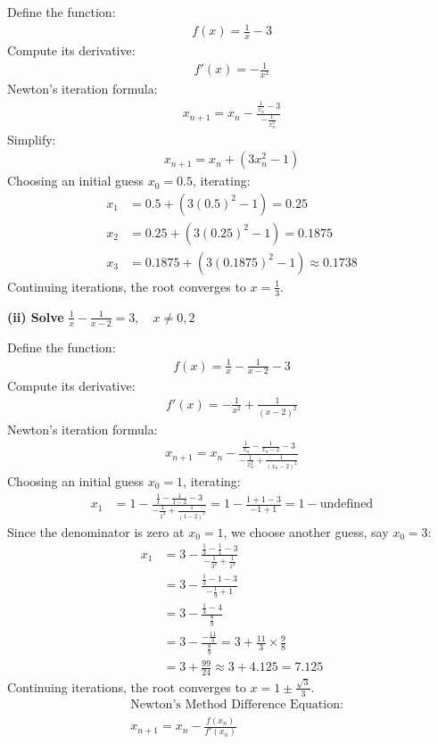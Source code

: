 \documentclass[journal]{IEEEtran}
\begin{document}
Define the function:
\begin{align}
    f(x) = \frac{1}{x} - 3
\end{align}
Compute its derivative:
\begin{align}
    f'(x) = -\frac{1}{x^2}
\end{align}
Newton's iteration formula:
\begin{align}
    x_{n+1} = x_n - \frac{\frac{1}{x_n} - 3}{-\frac{1}{x_n^2}}
\end{align}
Simplify:
\begin{align}
    x_{n+1} = x_n + (3x_n^2 - 1)
\end{align}
Choosing an initial guess $x_0 = 0.5$, iterating:
\begin{align}
    x_1 &= 0.5 + (3(0.5)^2 - 1) = 0.25 \\
    x_2 &= 0.25 + (3(0.25)^2 - 1) = 0.1875 \\
    x_3 &= 0.1875 + (3(0.1875)^2 - 1) \approx 0.1738
\end{align}
Continuing iterations, the root converges to $x = \frac{1}{3}$.

\textbf{(ii) Solve } $\frac{1}{x} - \frac{1}{x-2} = 3, \quad x \neq 0,2$

Define the function:
\begin{align}
    f(x) = \frac{1}{x} - \frac{1}{x-2} - 3
\end{align}
Compute its derivative:
\begin{align}
    f'(x) = -\frac{1}{x^2} + \frac{1}{(x-2)^2}
\end{align}
Newton's iteration formula:
\begin{align}
    x_{n+1} = x_n - \frac{\frac{1}{x_n} - \frac{1}{x_n-2} - 3}{-\frac{1}{x_n^2} + \frac{1}{(x_n-2)^2}}
\end{align}
Choosing an initial guess $x_0 = 1$, iterating:
\begin{align}
    x_1 &= 1 - \frac{\frac{1}{1} - \frac{1}{1-2} - 3}{-\frac{1}{1^2} + \frac{1}{(1-2)^2}} = 1 - \frac{1 + 1 - 3}{-1 + 1} = 1 - \text{undefined}
\end{align}
Since the denominator is zero at $x_0 = 1$, we choose another guess, say $x_0 = 3$:
\begin{align}
    x_1 &= 3 - \frac{\frac{1}{3} - \frac{1}{1} - 3}{-\frac{1}{3^2} + \frac{1}{1^2}} \\
    &= 3 - \frac{\frac{1}{3} - 1 - 3}{-\frac{1}{9} + 1} \\
    &= 3 - \frac{\frac{1}{3} - 4}{\frac{8}{9}} \\
    &= 3 - \frac{-\frac{11}{3}}{\frac{8}{9}} = 3 + \frac{11}{3} \times \frac{9}{8} \\
    &= 3 + \frac{99}{24} \approx 3 + 4.125 = 7.125
\end{align}
Continuing iterations, the root converges to $x = 1 \pm \frac{\sqrt{3}}{3}$.
\begin{align}
    &\text{Newton's Method Difference Equation:} \nonumber \\[2ex]
    &x_{n+1} = x_n - \frac{f(x_n)}{f'(x_n)} \label{eq:newton_general}
\end{align}
\end{document}
